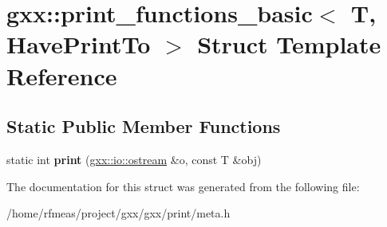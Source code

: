 \hypertarget{structgxx_1_1print__functions__basic}{}\section{gxx\+:\+:print\+\_\+functions\+\_\+basic$<$ T, Have\+Print\+To $>$ Struct Template Reference}
\label{structgxx_1_1print__functions__basic}
\subsection*{Static Public Member Functions}
\begin{DoxyCompactItemize}
\item 
static int {\bfseries print} (\hyperlink{classgxx_1_1io_1_1ostream}{gxx\+::io\+::ostream} \&o, const T \&obj)\hypertarget{structgxx_1_1print__functions__basic_a0c43e8eacf24872923a27729641f7cbf}{}\label{structgxx_1_1print__functions__basic_a0c43e8eacf24872923a27729641f7cbf}

\end{DoxyCompactItemize}


The documentation for this struct was generated from the following file\+:\begin{DoxyCompactItemize}
\item 
/home/rfmeas/project/gxx/gxx/print/meta.\+h\end{DoxyCompactItemize}
